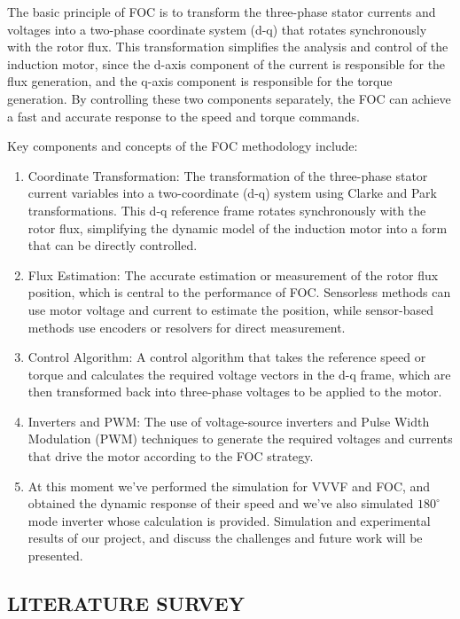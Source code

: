 The basic principle of FOC is to transform the three-phase stator currents and voltages into a two-phase coordinate system (d-q) that rotates synchronously with the rotor flux. This transformation simplifies the analysis and control of the induction motor, since the d-axis component of the current is responsible for the flux generation, and the q-axis component is responsible for the torque generation. By controlling these two components separately, the FOC can achieve a fast and accurate response to the speed and torque commands.

Key components and concepts of the FOC methodology include:
\begin{enumerate}
	\item  Coordinate Transformation: The transformation of the three-phase stator current variables into a two-coordinate (d-q) system using Clarke and Park transformations. This d-q reference frame rotates synchronously with the rotor flux, simplifying the dynamic model of the induction motor into a form that can be directly controlled.

	\item  Flux Estimation: The accurate estimation or measurement of the rotor flux position, which is central to the performance of FOC. Sensorless methods can use motor voltage and current to estimate the position, while sensor-based methods use encoders or resolvers for direct measurement.

	\item Control Algorithm: A control algorithm that takes the reference speed or torque and calculates the required voltage vectors in the d-q frame, which are then transformed back into three-phase voltages to be applied to the motor.

	\item Inverters and PWM: The use of voltage-source inverters and Pulse Width Modulation (PWM) techniques to generate the required voltages and currents that drive the motor according to the FOC strategy.

	\item At this moment we've performed the simulation for VVVF and FOC, and obtained the dynamic response of their speed and we've also simulated  $180^\circ$ mode inverter whose calculation is provided. Simulation and experimental results of our project, and discuss the challenges and future work will be presented.
\end{enumerate}
\subsection{LITERATURE SURVEY}



